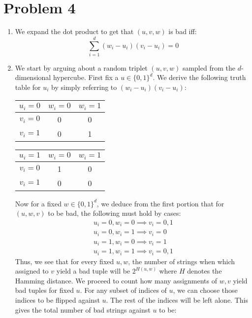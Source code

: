 \documentclass[12pt]{article}%
\begin{document}
\section*{Problem 4}
\begin{enumerate}
  \item We expand the dot product to get that $(u,v,w)$ is bad iff:
  $$\sum_{i=1}^d (w_i - u_i)(v_i - u_i) = 0 $$
  \item We start by arguing about a random triplet $(u,v,w)$ sampled from the $d$-dimensional hypercube. First fix a $u \in \{0,1\}^d$. We derive the following truth table for $u_i$ by simply referring to $(w_i - u_i)(v_i - u_i)$:
  \begin{center}
  \begin{tabular}{|c|c|c|}
    \hline
    $u_i = 0$ & $w_i = 0$ & $w_i = 1$ \\
   \hline
    $v_i = 0$ & 0 & 0 \\
     \hline
    $v_i = 1$ & 0 & 1 \\
     \hline
   \end{tabular}
   \quad
   \begin{tabular}{|c|c|c|}
     \hline
     $u_i = 1$ & $w_i = 0$ & $w_i = 1$ \\
    \hline
     $v_i = 0$ & 1 & 0 \\
      \hline
     $v_i = 1$ & 0 & 0 \\
      \hline
    \end{tabular} \newline
  \end{center}
    Now for a fixed $w \in \{0,1\}^d$, we deduce from the first portion that for $(u,w,v)$ to be bad, the following must hold by cases:
    \begin{gather*}
      u_i = 0, w_i = 0 \implies v_i = 0,1 \\
      u_i = 0, w_i = 1 \implies v_i = 0 \\
      u_i = 1, w_i = 0 \implies v_i = 1 \\
      u_i = 1, w_i = 1 \implies v_i = 0,1
    \end{gather*}
    Thus, we see that for every fixed $u,w$, the number of strings when which assigned to $v$ yield a bad tuple will be $2^{H(u,w)}$ where $H$ denotes the Hamming distance. We proceed to count how many assignments of $w,v$ yield bad tuples for fixed $u$. For any subset of indices of $u$, we can choose those indices to be flipped against $u$. The rest of the indices will be left alone. This gives the total number of bad strings against $u$ to be:

\end{enumerate}
\end{document}
